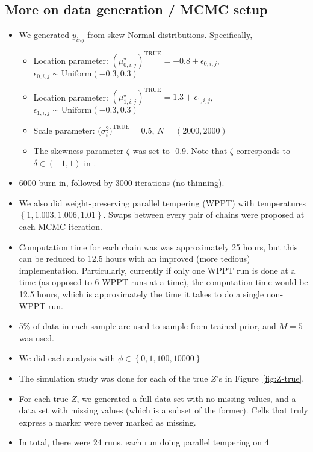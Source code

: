 \documentclass[10pt]{article} %
\newcommand{\p}[1]{\left(#1\right)}
\newcommand{\bc}[1]{ \left\{#1\right\} }
\newcommand{\Uniform}{ \text{Uniform} }
\def\true{\text{TRUE}}
\begin{document}
\subsection{More on data generation / MCMC setup}
\begin{itemize}
  \item We generated $y_{inj}$ from skew Normal distributions. Specifically,
  \begin{itemize}
    \item Location parameter: $(\mu_{0,i,j}^\star)^\true=-0.8 + \epsilon_{0,i,j}$, $\epsilon_{0,i,j} \sim \Uniform(-0.3, 0.3)$
    \item Location parameter: $(\mu_{1,i,j}^\star)^\true=1.3 + \epsilon_{1,i,j}$, $\epsilon_{1,i,j} \sim \Uniform(-0.3, 0.3)$
    \item Scale parameter: ($\sigma^2_i)^\true=0.5$, $N=(2000, 2000)$
    \item The skewness parameter $\zeta$ was set to -0.9. Note that $\zeta$
          corresponds to $\delta \in \p{-1, 1}$ in \cite{fruhwirth2010bayesian}.
  \end{itemize}
  \item 6000 burn-in, followed by 3000 iterations (no thinning).
  \item We also did weight-preserving parallel tempering (WPPT) with temperatures 
        $\bc{1, 1.003, 1.006, 1.01}$. Swaps between every pair of chains were
        proposed at each MCMC iteration.
  \item Computation time for each chain was was approximately 25 hours, but this can
        be reduced to 12.5 hours with an improved (more tedious) implementation.
        Particularly, currently if only one WPPT run is done at a time (as opposed
        to 6 WPPT runs at a time), the computation time would be 12.5 hours, which
        is approximately the time it takes to do a single non-WPPT run.
  \item 5\% of data in each sample are used to sample from trained prior, and
    $M=5$ was used.
  \item We did each analysis with $\phi \in \bc{0, 1, 100, 10000}$
  \item The simulation study was done for each of the true $Z$'s in 
        Figure~\ref{fig:Z-true}.
  \item For each true $Z$, we generated a full data set with no missing values,
        and a data set with missing values (which is a subset of the former). Cells
        that truly express a marker were never marked as missing.
  \item In total, there were 24 runs, each run doing parallel tempering on 4

\end{itemize}
\end{document}
